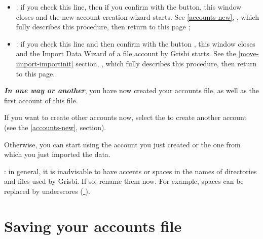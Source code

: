 \begin{enumerate}
\begin{itemize}
\item {} : if you check this line, then if you confirm with the  button, this window closes and the new account creation wizard starts. See  \vref{accounts-new}, ,  which fully describes this procedure, then return to this page ;

\item {} : if you check this line and then confirm with the  button ,  this window closes and the Import Data Wizard of a file account by Grisbi starts. See the \vref{move-import-importinit} section, , which fully describes this procedure, then return to this page.
\end{itemize}
\end{enumerate}

\label{start-newfile-end}

\textit{\textbf{In one way or another}}, you have now created your accounts file, as well as the first account of this file.


If you want to create other accounts now, select the  to create another account (see the \vref{accounts-new},  section).


Otherwise, you can start using the account you just created or the one from which you just imported the data.


 : in general, it is inadvisable to have accents or spaces in the names of directories and files used by Grisbi. If so, rename them now. For example, spaces can be replaced by underscores (\underline{ }).

\newpage


\section{Saving your accounts file\label{start-save}}

